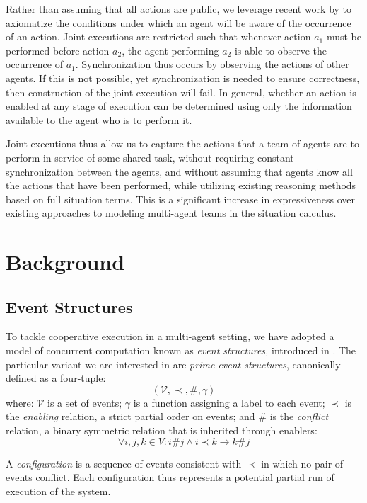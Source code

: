 Rather than assuming that all actions are public, we leverage recent
work by \citep{kelly07sc_know_obs} to axiomatize the conditions under
which an agent will be aware of the occurrence of an action. Joint
executions are restricted such that whenever action $a_{1}$ must
be performed before action $a_{2}$, the agent performing $a_{2}$
is able to observe the occurrence of $a_{1}$. Synchronization thus
occurs by observing the actions of other agents. If this is not possible,
yet synchronization is needed to ensure correctness, then construction
of the joint execution will fail. In general, whether an action is
enabled at any stage of execution can be determined using only the
information available to the agent who is to perform it.

Joint executions thus allow us to capture the actions that a team
of agents are to perform in service of some shared task, without requiring
constant synchronization between the agents, and without assuming
that agents know all the actions that have been performed, while utilizing
existing reasoning methods based on full situation terms. This is
a significant increase in expressiveness over existing approaches
to modeling multi-agent teams in the situation calculus.


\section{Background}


\subsection{Event Structures}

To tackle cooperative execution in a multi-agent setting, we have
adopted a model of concurrent computation known as \emph{event structures,}
introduced in \citep{npw79event_structures}. The particular variant
we are interested in are \emph{prime event structures}, canonically
defined as a four-tuple:\[
(\mathcal{V},\prec,\#,\gamma)\]
 where: $\mathcal{V}$ is a set of events; $\gamma$ is a function
assigning a label to each event; $\prec$ is the \emph{enabling} relation,
a strict partial order on events; and $\#$ is the \emph{conflict}
relation, a binary symmetric relation that is inherited through enablers:\[
\forall i,j,k\in V:i\#j\wedge i\prec k\rightarrow k\#j\]


A \emph{configuration} is a sequence of events consistent with $\prec$
in which no pair of events conflict. Each configuration thus represents
a potential partial run of execution of the system.

